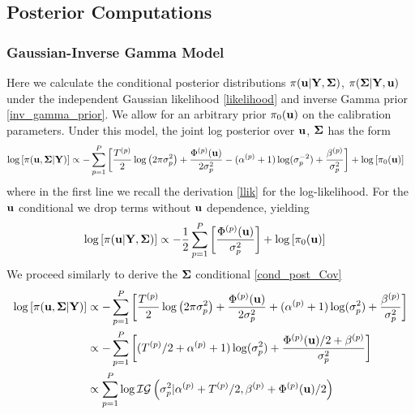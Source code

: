 \documentclass[12pt]{article}
\begin{document}
\subsection{Posterior Computations}

\subsubsection{Gaussian-Inverse Gamma Model}
Here we calculate the conditional posterior distributions $\pi(\mathbf{u}|\mathbf{Y}, \boldsymbol{\Sigma})$, $\pi(\boldsymbol{\Sigma}|\mathbf{Y}, \mathbf{u})$ under the independent Gaussian 
likelihood \ref{likelihood} and inverse Gamma prior \ref{inv_gamma_prior}. We allow for an arbitrary prior $\pi_0(\mathbf{u})$ on the calibration parameters.
Under this model, the joint log posterior over $\mathbf{u}$, $\boldsymbol{\Sigma}$ has the form 
\begin{align*}
\log\left[\pi(\mathbf{u}, \boldsymbol{\Sigma}|\mathbf{Y})\right] &\propto -\sum_{p = 1}^{P} \left[\frac{{T}^{(p)}}{2} \log\left(2\pi \sigma_{p}^2 \right) + \frac{{\Phi}^{(p)}(\mathbf{u})}{2\sigma_{p}^2}  - ({\alpha}^{(p)} + 1)\log(\sigma_{p}^{-2}) + \frac{{\beta}^{(p)}}{\sigma_{p}^2} \right] + \log\left[\pi_0(\mathbf{u})\right] 
\end{align*}
where in the first line we recall the derivation \ref{llik} for the log-likelihood. For the $\mathbf{u}$ conditional we drop terms without $\mathbf{u}$ dependence, yielding
\begin{align*}
\log\left[\pi(\mathbf{u}|\mathbf{Y}, \boldsymbol{\Sigma})\right] &\propto -\frac{1}{2} \sum_{p = 1}^{P} \left[\frac{{\Phi}^{(p)}(\mathbf{u})}{\sigma_{p}^2}\right]  + \log\left[\pi_0(\mathbf{u})\right] 
\end{align*}
We proceed similarly to derive the $\boldsymbol{\Sigma}$ conditional \ref{cond_post_Cov}
\begin{align*}
\log\left[\pi(\mathbf{u}, \boldsymbol{\Sigma}|\mathbf{Y})\right] &\propto - \sum_{p = 1}^{P} \left[\frac{{T}^{(p)}}{2} \log\left(2\pi \sigma_{p}^2 \right) + \frac{{\Phi}^{(p)}(\mathbf{u})}{2\sigma_{p}^2}  + ({\alpha}^{(p)} + 1)\log(\sigma_{p}^{2}) + \frac{{\beta}^{(p)}}{\sigma_{p}^2} \right] \\
&\propto - \sum_{p = 1}^{P} \left[({T}^{(p)}/2 + {\alpha}^{(p)} + 1)\log(\sigma_{p}^2) + \frac{{\Phi}^{(p)}(\mathbf{u})/2 + {\beta}^{(p)}}{\sigma_{p}^2} \right] \\
&\propto \sum_{p = 1}^{P} \log \mathcal{IG}\left(\sigma_{p}^2|{\alpha}^{(p)} + {T}^{(p)}/2, {\beta}^{(p)} + {\Phi}^{(p)}(\mathbf{u})/2 \right)
\end{align*}
\end{document}
